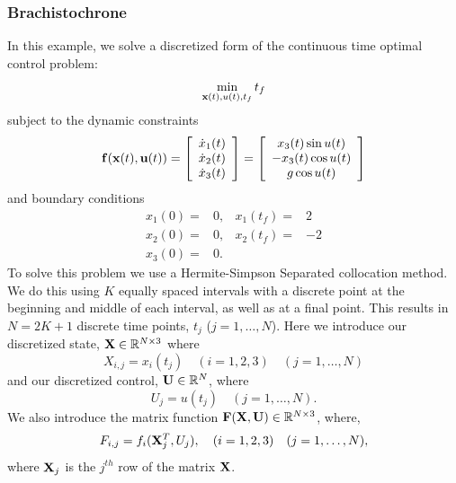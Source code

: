 \documentclass[10pt,pdftex]{article}
\begin{document}
\subsubsection{Brachistochrone}
In this example, we solve a discretized form of the continuous time optimal control problem:
\begin{equation}
\min\limits_{\mathbf{x}(t),u(t),t_f} t_f
\end{equation}
subject to the dynamic constraints
\begin{equation}\label{brachcontdynamics}
\mathbf{f}(\mathbf{x}(t),\mathbf{u}(t)) = 
\left[ \begin{array}{c}
\dot{x}_1(t) \\ \dot{x}_2(t)\\ \dot{x}_3(t)
\end{array} \right] = 
\left[ \begin{array}{c}
x_3(t) \sin u(t)\\
-x_3(t) \cos u(t) \\
g \cos u(t)
\end{array} \right]
\end{equation}
and boundary conditions
\begin{equation}\label{brachcontbound}
\begin{array}{rrrr}
x_1(0) = & 0, & x_1(t_f) = & 2 \\
x_2(0) = & 0, & x_2(t_f) = & -2 \\
x_3(0) = & 0. & & 
\end{array}
\end{equation}
To solve this problem we use a Hermite-Simpson Separated collocation method. We do this using $K$ equally spaced intervals with a discrete point at the beginning and middle of each interval, as well as at a final point. This results in $N = 2K+1$ discrete time points, $t_j$ ($j = 1,\dots,N$). Here we introduce our discretized state, $\mathbf{X} \in \mathbb{R}^{N \times 3}$ where
\begin{equation}
X_{i,j} = x_i(t_j) \quad (i = 1,2,3) \quad	 (j = 1,\dots,N)
\end{equation}
and our discretized control, $\mathbf{U} \in \mathbb{R}^N$, where
\begin{equation}
U_j = u(t_j) \quad (j = 1,\dots,N).
\end{equation}
We also introduce the matrix function $\mathbf{F}(\mathbf{X},\mathbf{U}) \in \mathbb{R}^{N \times 3}$, where,
\begin{equation}
F_{i,j} = f_i(\mathbf{X}_j^T,U_j), \quad (i = 1,2,3) \quad (j = 1,\dots,N),
\end{equation}
where $\mathbf{X}_j$ is the $j^{th}$ row of the matrix $\mathbf{X}$. 
\end{document}
